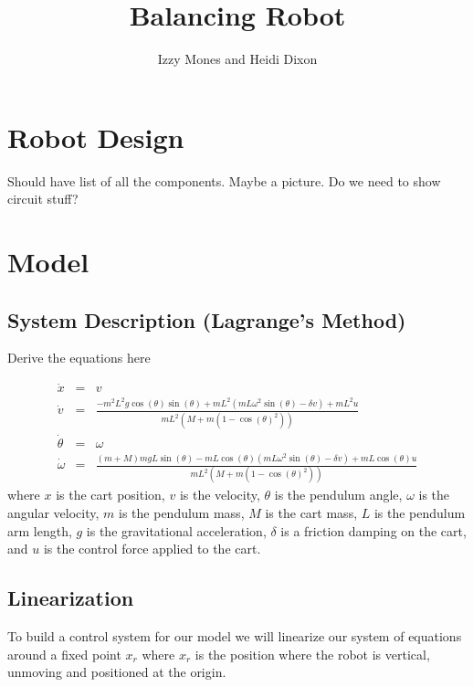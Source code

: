 \documentclass[]{article}
\title{Balancing Robot}
\author{Izzy Mones and Heidi Dixon}
\begin{document}
	\maketitle

\section*{Robot Design}
Should have list of all the components. Maybe a picture. Do we need to show circuit stuff?

\section*{Model}
\subsection*{System Description (Lagrange's Method)}
Derive the equations here

\begin{eqnarray}
	\dot{x} & = & v \\
	\dot{v}          & = & \frac{-m^2L^2g \cos(\theta)\sin(\theta) + mL^2(mL\omega^2 \sin(\theta)-\delta v)+mL^2u }{mL^2(M+m(1-\cos(\theta)^2))} \\
	\dot{\theta}  &= & \omega \\
	\dot{\omega}  &= & \frac{(m+M)mgL\sin(\theta)-mL\cos(\theta)(mL\omega^2\sin(\theta)-\delta v)+mL\cos(\theta)u}{mL^2(M+m(1-\cos(\theta)^2))}
\end{eqnarray}
where $x$ is the cart position, $v$ is the velocity, $\theta$ is the pendulum angle, $\omega$ is the angular velocity, $m$ is the pendulum mass, $M$ is the cart mass, $L$ is the pendulum arm length, $g$ is the gravitational acceleration, $\delta$ is a friction damping on the cart, and $u$ is the control force applied to the cart.


\subsection*{Linearization}
To build a control system for our model we will linearize our system of equations around a fixed point $x_r$ where $x_r$ is the position where the robot is vertical, unmoving and positioned at the origin.  
\end{document}
